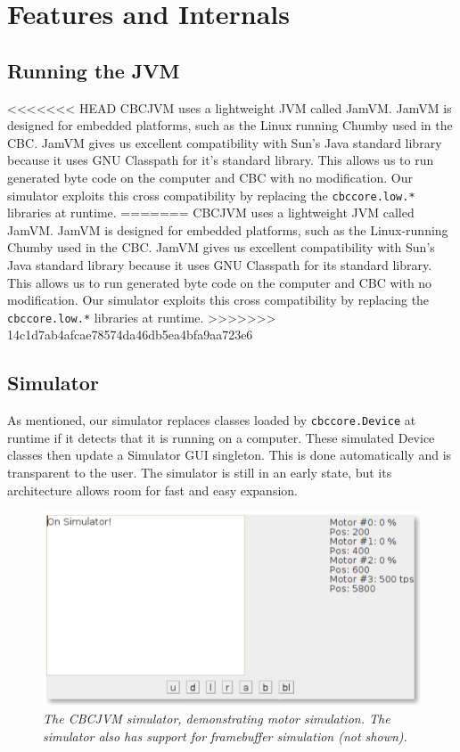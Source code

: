 \documentclass[12pt,letterpaper]{article}
\begin{document}
\pagebreak
\section{Features and Internals}

\subsection{Running the JVM}

<<<<<<< HEAD
CBCJVM uses a lightweight JVM called JamVM\cite{jamVM}. JamVM is designed for embedded platforms, such as the Linux running Chumby used in the CBC. JamVM gives us excellent compatibility with Sun's Java standard library because it uses GNU Classpath for it's standard library. This allows us to run generated byte code on the computer and CBC with no modification. Our simulator exploits this cross compatibility by replacing the \texttt{cbccore.low.*} libraries at runtime.
=======
CBCJVM uses a lightweight JVM called JamVM. JamVM is designed for embedded platforms, such as the Linux-running Chumby used in the CBC. JamVM gives us excellent compatibility with Sun's Java standard library because it uses GNU Classpath for its standard library. This allows us to run generated byte code on the computer and CBC with no modification. Our simulator exploits this cross compatibility by replacing the \texttt{cbccore.low.*} libraries at runtime.
>>>>>>> 14c1d7ab4afcae78574da46db5ea4bfa9aa723e6



\subsection{Simulator}

As mentioned, our simulator replaces classes loaded by \texttt{cbccore.Device} at runtime if it detects that it is running on a computer. These simulated Device classes then update a Simulator GUI singleton. This is done automatically and is transparent to the user. The simulator is still in an early state, but its architecture allows room for fast and easy expansion.

\begin{figure}[h]
\begin{flushright}
\includegraphics[width=.75\textwidth]{simulator.png}
\end{flushright}
\caption{\textit{The CBCJVM simulator, demonstrating motor simulation. The simulator also has support for framebuffer simulation (not shown).}}
\end{figure}
\end{document}
